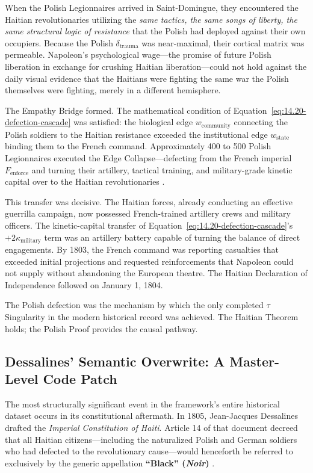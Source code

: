 When the Polish Legionnaires arrived in Saint-Domingue, they encountered the Haitian revolutionaries utilizing the \textit{same tactics, the same songs of liberty, the same structural logic of resistance} that the Polish had deployed against their own occupiers. Because the Polish $\delta_{\text{trauma}}$ was near-maximal, their cortical matrix was permeable. Napoleon's psychological wage---the promise of future Polish liberation in exchange for crushing Haitian liberation---could not hold against the daily visual evidence that the Haitians were fighting the same war the Polish themselves were fighting, merely in a different hemisphere.

The Empathy Bridge formed. The mathematical condition of Equation~\eqref{eq:14.20-defection-cascade} was satisfied: the biological edge $w_{\text{community}}$ connecting the Polish soldiers to the Haitian resistance exceeded the institutional edge $w_{\text{state}}$ binding them to the French command. Approximately 400 to 500 Polish Legionnaires executed the Edge Collapse---defecting from the French imperial $F_{\text{enforce}}$ and turning their artillery, tactical training, and military-grade kinetic capital over to the Haitian revolutionaries \cite{pachonski_polish_haiti}.

This transfer was decisive. The Haitian forces, already conducting an effective guerrilla campaign, now possessed French-trained artillery crews and military officers. The kinetic-capital transfer of Equation~\eqref{eq:14.20-defection-cascade}'s $+2\kappa_{\text{military}}$ term was an artillery battery capable of turning the balance of direct engagements. By 1803, the French command was reporting casualties that exceeded initial projections and requested reinforcements that Napoleon could not supply without abandoning the European theatre. The Haitian Declaration of Independence followed on January 1, 1804.

The Polish defection was the mechanism by which the only completed $\tau$ Singularity in the modern historical record was achieved. The Haitian Theorem holds; the Polish Proof provides the causal pathway.

\subsection{Dessalines' Semantic Overwrite: A Master-Level Code Patch}
\label{subsec:dessalines_overwrite}

The most structurally significant event in the framework's entire historical dataset occurs in its constitutional aftermath. In 1805, Jean-Jacques Dessalines drafted the \textit{Imperial Constitution of Haiti}. Article 14 of that document decreed that all Haitian citizens---including the naturalized Polish and German soldiers who had defected to the revolutionary cause---would henceforth be referred to exclusively by the generic appellation \textbf{``Black'' (\textit{Noir})} \cite{haiti_constitution_1805}.

